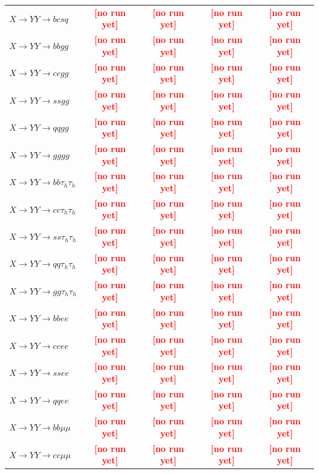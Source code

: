 \documentclass[12pt]{article}   %
\newcommand{\pending}[1]{\textcolor{red}{\textbf{[#1]}}}
\begin{document}
\begin{landscape}
{\begin{longtable}{@{\extracolsep{\fill}}lcccc@{}}
$X\to YY\to bcsq$ & \pending{no run yet} & \pending{no run yet} & \pending{no run yet} & \pending{no run yet} \\
$X\to YY\to bbgg$ & \pending{no run yet} & \pending{no run yet} & \pending{no run yet} & \pending{no run yet} \\
$X\to YY\to ccgg$ & \pending{no run yet} & \pending{no run yet} & \pending{no run yet} & \pending{no run yet} \\
$X\to YY\to ssgg$ & \pending{no run yet} & \pending{no run yet} & \pending{no run yet} & \pending{no run yet} \\
$X\to YY\to qqgg$ & \pending{no run yet} & \pending{no run yet} & \pending{no run yet} & \pending{no run yet} \\
$X\to YY\to gggg$ & \pending{no run yet} & \pending{no run yet} & \pending{no run yet} & \pending{no run yet} \\
\midrule
$X\to YY\to bb\tau_h\tau_h$ & \pending{no run yet} & \pending{no run yet} & \pending{no run yet} & \pending{no run yet} \\
$X\to YY\to cc\tau_h\tau_h$ & \pending{no run yet} & \pending{no run yet} & \pending{no run yet} & \pending{no run yet} \\
$X\to YY\to ss\tau_h\tau_h$ & \pending{no run yet} & \pending{no run yet} & \pending{no run yet} & \pending{no run yet} \\
$X\to YY\to qq\tau_h\tau_h$ & \pending{no run yet} & \pending{no run yet} & \pending{no run yet} & \pending{no run yet} \\
$X\to YY\to gg\tau_h\tau_h$ & \pending{no run yet} & \pending{no run yet} & \pending{no run yet} & \pending{no run yet} \\
\midrule
$X\to YY\to bbee$ & \pending{no run yet} & \pending{no run yet} & \pending{no run yet} & \pending{no run yet} \\
$X\to YY\to ccee$ & \pending{no run yet} & \pending{no run yet} & \pending{no run yet} & \pending{no run yet} \\
$X\to YY\to ssee$ & \pending{no run yet} & \pending{no run yet} & \pending{no run yet} & \pending{no run yet} \\
$X\to YY\to qqee$ & \pending{no run yet} & \pending{no run yet} & \pending{no run yet} & \pending{no run yet} \\
$X\to YY\to bb\mu\mu$ & \pending{no run yet} & \pending{no run yet} & \pending{no run yet} & \pending{no run yet} \\
$X\to YY\to cc\mu\mu$ & \pending{no run yet} & \pending{no run yet} & \pending{no run yet} & \pending{no run yet} \\

\end{longtable}}
\end{landscape}
\end{document}
